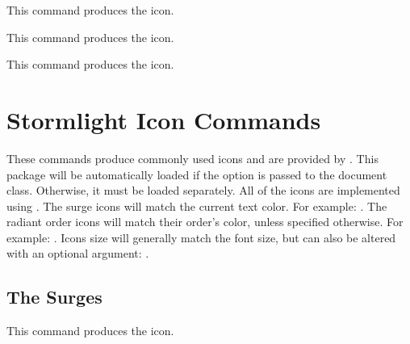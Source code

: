\documentclass[article,ariandor]{plotweaver}
\begin{document}
\begin{docCommand}[
    doc name        = feUnknownJ,
    doc description = { \feUnknownJ },
    doc parameter   = \oarg{scale},
    doc new     = 2026-08-26,
  ]{}{}
  This command produces the \feUnknownJ icon.
\end{docCommand}

\begin{docCommand}[
    doc name        = feUnknownX,
    doc description = { \feUnknownX },
    doc parameter   = \oarg{scale},
    doc new     = 2026-08-26,
  ]{}{}
  This command produces the \feUnknownX icon.
\end{docCommand}

\begin{docCommand}[
    doc name        = feZinc,
    doc description = { \feZinc },
    doc parameter   = \oarg{scale},
    doc new     = 2026-08-26,
  ]{}{}
  This command produces the \feZinc icon.
\end{docCommand}

\section{Stormlight Icon Commands}
These commands produce commonly used icons and are provided by . This package will be automatically loaded if the  option is passed to the document class. Otherwise, it must be loaded separately. All of the icons are implemented using . The surge icons will match the current text color. For example: \textcolor{red}{\progression} \textcolor{blue}{\progression} \textcolor{green}{\progression}. The radiant order icons will match their order's color, unless specified otherwise. For example: \windrunner \windrunner[0.05em][complicationred]. Icons size will generally match the font size, but can also be altered with an optional argument: \division[0.6] \division[0.4] \division[0.2].

\subsection{The Surges}

\begin{docCommand}[
    doc name        = abrasion,
    doc description = { \abrasion },
    doc parameter   = \oarg{scale},
    doc new     = 2026-08-29,
  ]{}{}
  This command produces the \abrasion icon.
\end{docCommand}
\end{document}

